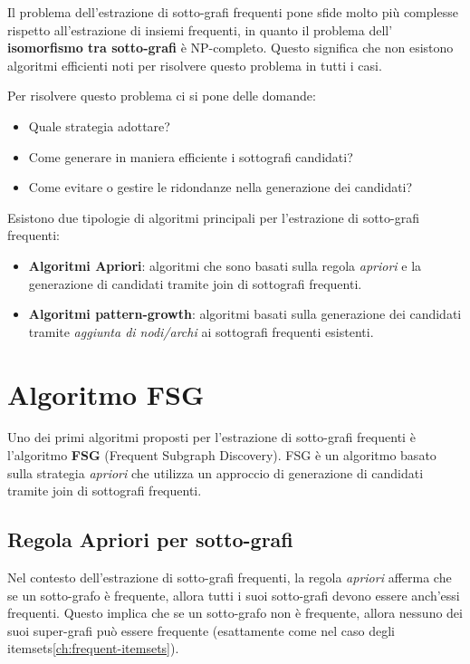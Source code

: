 Il problema dell'estrazione di sotto-grafi frequenti pone sfide molto più complesse rispetto all'estrazione di insiemi frequenti, in quanto il problema dell' \textbf{isomorfismo tra sotto-grafi} è NP-completo. Questo significa che non esistono algoritmi efficienti noti per risolvere questo problema in tutti i casi.

\noindent
Per risolvere questo problema ci si pone delle domande:
\begin{itemize}
    \item Quale strategia adottare?
    \item Come generare in maniera efficiente i sottografi candidati?
    \item Come evitare o gestire le ridondanze nella generazione dei candidati?
\end{itemize}
Esistono due tipologie di algoritmi principali per l'estrazione di sotto-grafi frequenti:
\begin{itemize}
    \item \textbf{Algoritmi Apriori}: algoritmi che sono basati sulla regola \emph{apriori} e la generazione di candidati tramite join di sottografi frequenti.
    \item \textbf{Algoritmi pattern-growth}: algoritmi basati sulla generazione dei candidati tramite \emph{aggiunta di nodi/archi} ai sottografi frequenti esistenti.
\end{itemize}

\section{Algoritmo FSG}
Uno dei primi algoritmi proposti per l'estrazione di sotto-grafi frequenti è l'algoritmo \textbf{FSG} (Frequent Subgraph Discovery). FSG è un algoritmo basato sulla strategia \emph{apriori} che utilizza un approccio di generazione di candidati tramite join di sottografi frequenti.

\subsection{Regola Apriori per sotto-grafi}
Nel contesto dell'estrazione di sotto-grafi frequenti, la regola \emph{apriori} afferma che se un sotto-grafo è frequente, allora tutti i suoi sotto-grafi devono essere anch'essi frequenti. Questo implica che se un sotto-grafo non è frequente, allora nessuno dei suoi super-grafi può essere frequente (esattamente come nel caso degli itemsets\ref{ch:frequent-itemsets}).

